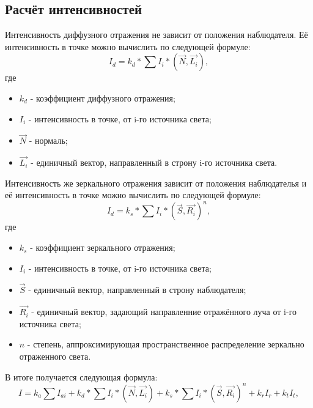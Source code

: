 \documentclass[12pt,a4paper,oneside]{report}
\begin{document}
    		\subsection{Расчёт интенсивностей}
    			\quad Интенсивность диффузного отражения не зависит от положения наблюдателя. Её интенсивность в точке можно вычислить по следующей формуле:
    			\[
    				I_{d} = k_{d} * \sum I_{i}*(\vec{N}, \vec{L_{i}}),
    			\]
    			где 
				\begin{itemize}
    				\item $k_{d}$ - коэффициент диффузного отражения;
    				\item $I_{i}$ - интенсивность в точке, от i-го источника света;
    				\item $\vec{N}$ - нормаль;
    				\item $\vec{L_{i}}$ - единичный вектор, направленный в строну i-го источника света.
    			\end{itemize}
    			
    			Интенсивность же зеркального отражения зависит от положения наблюдателья и её интенсивность в точке можно вычислить по следующей формуле:
    			\[
    				I_{d} = k_{s} * \sum I_{i}*(\vec{S}, \vec{R_{i}})^n,
    			\]
    			где 
				\begin{itemize}
    				\item $k_{s}$ - коэффициент зеркального отражения;
    				\item $I_{i}$ - интенсивность в точке, от i-го источника света;
    				\item $\vec{S}$ - единичный вектор, направленный в строну наблюдателя;
    				\item $\vec{R_{i}}$ - единичный вектор, задающий направленние отражённого луча от i-го источника света;
    				\item $n$ - степень, аппроксимирующая пространственное распределение зеркально отраженного света.
    			\end{itemize}
    			
    		 В итоге получается следующая формула:
    		\[
    				I = k_{a} \sum I_{ai} + k_{d} * \sum I_{i}*(\vec{N}, \vec{L_{i}}) + k_{s} * \sum I_{i}*(\vec{S}, \vec{R_{i}})^n + k_{r}I_{r} + k_{t}I_{t},
			\]
\end{document}
